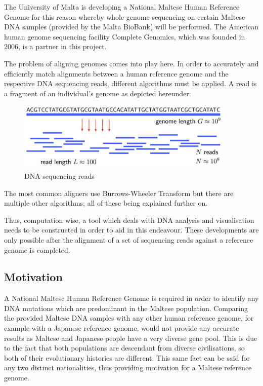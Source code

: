 \documentclass{csfyp}
\begin{document}
The University of Malta is developing a National Maltese Human Reference Genome for this reason whereby whole genome sequencing on certain Maltese DNA samples (provided by the Malta BioBank) will be performed.  The American human genome sequencing facility Complete Genomics, which was founded in 2006, is a partner in this project.   

The problem of aligning genomes comes into play here.  In order to accurately and efficiently match alignments between a human reference genome and the respective DNA sequencing reads, different algorithms must be applied.  A read is a fragment of an individual's genome as depicted hereunder:

\begin{figure}[h!]
  \includegraphics[width=\linewidth, height=125]{dnareads.jpg}
  \caption{DNA sequencing reads}
  \label{fig:reads}
\end{figure}

The most common aligners use Burrows-Wheeler Transform \cite{bwtransform, cgreads} but there are multiple other algorithms; all of these being explained further on.  

Thus, computation wise, a tool which deals with DNA analysis and visualisation needs to be constructed in order to aid in this endeavour.  These developments are only possible after the alignment of a set of sequencing reads against a reference genome is completed.  

\subsection{Motivation}\vspace{-2ex}

A National Maltese Human Reference Genome is required in order to identify any DNA mutations which are predominant in the Maltese population.  Comparing the provided Maltese DNA samples with any other human reference genome, for example with a Japanese reference genome, would not provide any accurate results as Maltese and Japanese people have a very diverse gene pool.  This is due to the fact that both populations are descendant from diverse civilisations, so both of their evolutionary histories are different.  This same fact can be said for any two distinct nationalities, thus providing motivation for a Maltese reference genome.
\end{document}
